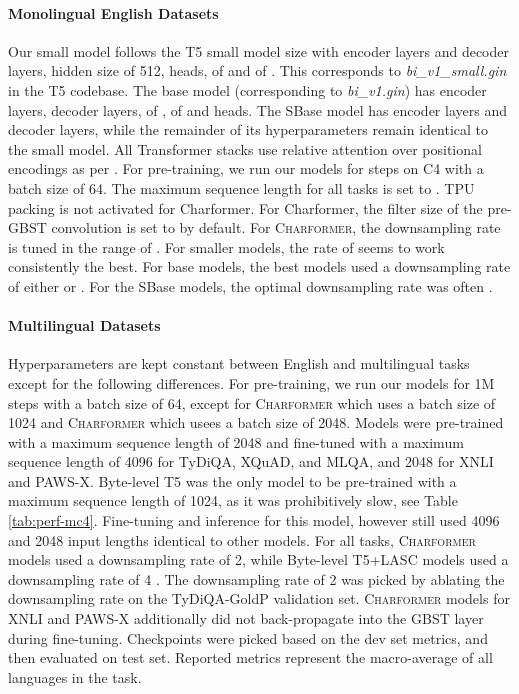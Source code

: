 \documentclass{article} \usepackage{iclr2022_conference,times}
\newcommand{\charformer}{\textsc{Charformer}\xspace}
\newcommand{\charformertall}{\textsc{Charformer}\xspace}
\newcommand{\charformertalllong}{\textsc{Charformer}\xspace}
\newcommand{\bytebase}{Byte-level T5\xspace}
\newcommand{\canine}{Byte-level T5+LASC\xspace}
\begin{document}
\paragraph{Monolingual English Datasets} Our small model follows the T5 small model size with  encoder layers and  decoder layers, hidden size  of 512,  heads,  of  and  of . This corresponds to \textit{bi\_v1\_small.gin} in the T5 codebase. The base model (corresponding to \textit{bi\_v1.gin}) has  encoder layers,  decoder layers,  of ,  of  and  heads. The SBase model has  encoder layers and  decoder layers, while the remainder of its hyperparameters remain identical to the small model. All Transformer stacks use relative attention over positional encodings as per \citep{Raffel2020t5}. For pre-training, we run our models for  steps on C4 with a batch size of 64. The maximum sequence length for all tasks is set to .  TPU packing is not activated for Charformer. For Charformer, the filter size of the pre-GBST convolution is set to  by default. For \charformer, the downsampling rate is tuned in the range of . For smaller models, the rate of  seems to work consistently the best. For base models, the best models used a downsampling rate of either  or . For the SBase models, the optimal downsampling rate was often .

\paragraph{Multilingual Datasets} Hyperparameters are kept constant between English and multilingual tasks except for the following differences. For pre-training, we run our models for 1M steps with a batch size of 64, except for \charformertall which uses a batch size of 1024 and \charformertalllong which usees a batch size of 2048. Models were pre-trained with a maximum sequence length of 2048 and fine-tuned with a maximum sequence length of 4096 for TyDiQA, XQuAD, and MLQA, and 2048 for XNLI and PAWS-X. \bytebase was the only model to be pre-trained with a maximum sequence length of 1024, as it was prohibitively slow, see Table \ref{tab:perf-mc4}. Fine-tuning and inference for this model, however still used 4096 and 2048 input lengths identical to other models. For all tasks, \charformer models used a downsampling rate of 2, while \canine models used a downsampling rate of 4 \citep{clark2021canine}. The downsampling rate of 2 was picked by ablating the downsampling rate on the TyDiQA-GoldP validation set. \charformer models for XNLI and PAWS-X additionally did not back-propagate into the GBST layer during fine-tuning. Checkpoints were picked based on the dev set metrics, and then evaluated on test set. Reported metrics represent the macro-average of all languages in the task. 
\end{document}
